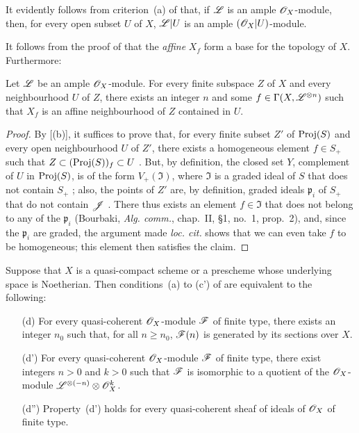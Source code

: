 It evidently follows from criterion~(a) of  that, if $\mathscr{L}$ is an ample $\mathscr{O}_X$-module, then, for every open subset $U$ of $X$, $\mathscr{L}|U$ is an ample $(\mathscr{O}_X|U)$-module.

It follows from the proof of  that the \emph{affine} $X_f$ form a base for the topology of $X$.
Furthermore:

\begin{corollary}[4.5.4]
\label{II.4.5.4}
Let $\mathscr{L}$ be an ample $\mathscr{O}_X$-module.
For every finite subspace $Z$ of $X$ and every neighbourhood $U$ of $Z$, there exists an integer $n$ and some $f\in\Gamma(X,\mathscr{L}^{\otimes n})$ such that $X_f$ is an affine neighbourhood of $Z$ contained in $U$.
\end{corollary}

\begin{proof}
By [(b)], it suffices to prove that, for every finite subset $Z'$ of $\operatorname{Proj}(S)$ and every open neighbourhood $U$ of $Z'$, there exists a homogeneous element $f\in S_+$ such that $Z\subset(\operatorname{Proj}(S))_f\subset U$ .
But, by definition, the closed set $Y$, complement of $U$ in $\operatorname{Proj}(S)$, is of the form $V_+(\mathfrak{I})$, where $\mathfrak{I}$ is a graded ideal of $S$ that does not contain $S_+$ ;
also, the points of $Z'$ are, by definition, graded ideals $\mathfrak{p}_i$ of $S_+$ that do not contain $\mathscr{J}$ .
There thus exists an element $f\in\mathfrak{I}$ that does not belong to any of the $\mathfrak{p}_i$ (Bourbaki, \emph{Alg. comm.}, chap.~II, \S1, no.~1, prop.~2), and, since the $\mathfrak{p}_i$ are graded, the argument made \emph{loc. cit.} shows that we can even take $f$ to be homogeneous;
this element then satisfies the claim.
\end{proof}

\begin{proposition}[4.5.5]
\label{II.4.5.5}
Suppose that $X$ is a quasi-compact scheme or a prescheme whose underlying space is Noetherian.
Then conditions~(a) to (c') of  are equivalent to the following:
\begin{enumerate}
  \item[\rm{(d)}] For every quasi-coherent $\mathscr{O}_X$-module $\mathscr{F}$ of finite type, there exists an integer $n_0$ such that, for all $n\geq n_0$, $\mathscr{F}(n)$ is generated by its sections over $X$.
  \item[\rm{(d')}] For every quasi-coherent $\mathscr{O}_X$-module $\mathscr{F}$ of finite type, there exist integers $n>0$ and $k>0$ such that $\mathscr{F}$ is isomorphic to a quotient of the $\mathscr{O}_X$-module $\mathscr{L}^{\otimes(-n)}\otimes\mathscr{O}_X^k$.
  \item[\rm{(d'')}] Property~(d') holds for every quasi-coherent sheaf of ideals of $\mathscr{O}_X$ of finite type.
\end{enumerate}
\end{proposition}

